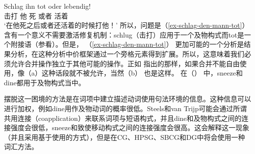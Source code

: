 \ea
\gll Schlag ihn tot oder lebendig!\\
     击打   他 死 或者 活着\\
\glt `在他死之后或者还活着的时候打他！'
\z
所以，问题是（\ref{ex-schlag-den-mann-tot}） 含有一个意义不需要激活修复机制：schlug（击打）应用于一个及物构式而tot是一个附接语（参看\citealp{Winkler97a}）。但是， （\ref{ex-schlag-den-mann-tot}） 更加可能的一个分析是结果分析，在这种分析中价框架通过一个旁格元素得到扩展。所以，这意味着我们必须允许合并操作独立于其他可能的操作。正如 \citet[]{SvT2011a}指出的那样，如果合并不能自由使用，像（a）这种话段就不被允许，当然（b） 也是这样。
\eal
{}
\zl
在（） 中，sneeze和dine都用于及物构式当中。

摆脱这一困境的方法是在词项中建立描述动词使用句法环境的信息。这种信息可以进行加权，例如dine用作及物动词的概率很低。Steels和van Trijp可能会通过所谓共用连接（coapplication）来联系词项与短语构式，并且dine和及物构式之间的连接强度会很低，sneeze和致使移动构式之间的连接强度会很高。这会解释这一现象（并且采用基于使用的方式），但是在CG、HPSG、SBCG和DG中将会使用一种词汇方法。

